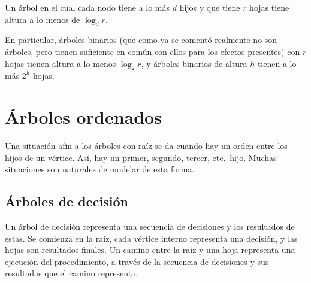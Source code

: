   \begin{corollary}
    \label{cor:arbol-hojas}
    Un árbol en el cual cada nodo tiene a lo más \(d\) hijos
    y que tiene \(r\) hojas tiene altura a lo menos de \(\log_d r\).
  \end{corollary}

  En particular,
  árboles binarios%
  (que como ya se comentó realmente no son árboles,
   pero tienen suficiente en común con ellos
   para los efectos presentes)
  con \(r\) hojas tienen altura a lo menos \(\log_2 r\),
  y árboles binarios de altura \(h\) tienen a lo más \(2^h\) hojas.

\section{Árboles ordenados}
\label{sec:arbol-ordenado}%

  Una situación afín a los árboles con raíz
  se da cuando hay un orden entre los hijos de un vértice.
  Así,
  hay un primer,
  segundo,
  tercer,
  etc.~hijo.
  Muchas situaciones son naturales de modelar de esta forma.

\subsection{Árboles de decisión}
\label{sec:arbol-decision}

  Un árbol de decisión representa una secuencia de decisiones
  y los resultados de estas.
  Se comienza en la raíz,
  cada vértice interno representa una decisión,
  y las hojas son resultados finales.
  Un camino entre la raíz y una hoja representa
  una ejecución del procedimiento,
  a través de la secuencia de decisiones y sus resultados
  que el camino representa.


